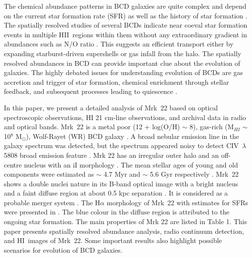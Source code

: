 \documentclass[useAMS,usenatbib]{mn2e}
\def\HI{H{\small{I}}~}
\begin{document}
The chemical abundance patterns in BCD galaxies are quite complex and depend on the current star formation rate (SFR) as well as the history of star formation \citep{2006MNRAS.372.1069M}. The spatially resolved studies of several BCDs indicate near coeval star formation events in multiple H{\small{II}}~regions within them without any extraordinary gradient in abundances such as N/O ratio \citep{2013AdAst2013E..20L}. This suggests an efficient transport either by expanding starburst-driven supershells or gas infall from the halo. The spatially resolved abundances in BCD can provide important clue about the evolution of galaxies. The highly debated issues for understanding evolution of BCDs are gas accretion and trigger of star formation, chemical enrichment through stellar feedback, and subsequent processes leading to quiescence \citep{1985ApJ...299..881T,1988MNRAS.233..553D,1998MNRAS.299..249S,2000MNRAS.313..291F,2002A&A...389..367T,
2006A&A...445..875R,2008MNRAS.388L..10B,2009A&A...508..615L,2013AdAst2013E..20L,2016MNRAS.462...92J}.

In this paper, we present a detailed analysis of Mrk~22 based on optical spectroscopic observations, HI 21 cm-line observations, and archival data in radio and optical bands. Mrk~22 is a metal poor (12 + log(O/H) $\sim$ 8), gas-rich (M$_{HI}$ $\sim$10$^{8}$ M$_{\odot}$), Wolf-Rayet (WR) BCD galaxy \citep{1994ApJ...435..647I,1999ApJ...527..757I,1999AJ....117.2789H,2002AJ....124..862H,2010ApJ...710..663Z,
2011AJ....141...68Z,2013ApJ...764...44Z}. A broad nebular emission line in the galaxy spectrum was detected, but the spectrum appeared noisy to detect C{\small{IV}}~$\lambda$5808 broad emission feature \citep{1994ApJ...435..647I}. Mrk 22 has an irregular outer halo and an off-centre nucleus with an iI morphology \citep{1986sfdg.conf...73L}. The mean stellar ages of young and old components were estimated as $\sim$ 4.7 Myr and $\sim$ 5.6 Gyr respectively \citep{2011AJ....141...68Z}. Mrk~22 shows a double nuclei nature in its B-band optical image with a bright nucleus and a faint diffuse region at about 0.5 kpc separation \citep{1993ApJS...85...27M}. It is considered as a probable merger system \citep{2014ApJ...784...16M}. The H${\alpha}$ morphology of Mrk~22 with estimates for SFRs were presented in \citet{2016MNRAS.462...92J}. The blue colour in the diffuse region is attributed to the ongoing star formation. The main properties of Mrk 22 are listed in Table 1. This paper presents spatially resolved abundance analysis, radio continuum detection, and \HI images of Mrk~22. Some important results also highlight possible scenarios for evolution of BCD galaxies. 
\end{document}
